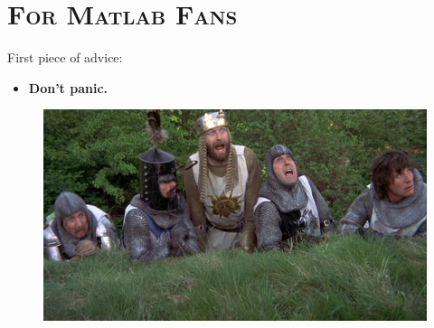 \documentclass[xcolor=x11names, compress,handout]{beamer}
\renewcommand{\(}{\begin{columns}}
\renewcommand{\)}{\end{columns}}
\newcommand{\<}[1]{\begin{column}{#1}}
\renewcommand{\>}{\end{column}}
\newcommand{\btVFill}{\vskip0pt plus 1filll}
\begin{document}
\section{ \scshape For Matlab Fans}
\begin{frame}{}
\large
\vspace{30pt}


First piece of advice:

\pause
\vspace{10pt}

\begin{itemize}
  \item \textbf{\Large Don't panic.}
\end{itemize}

\vspace{20pt}

\begin{figure}[b]
  \centering
  \includegraphics[width=\textwidth, clip, trim= 0 100 0 0]{HolyGrail072}
\end{figure}

\end{frame}
\end{document}
